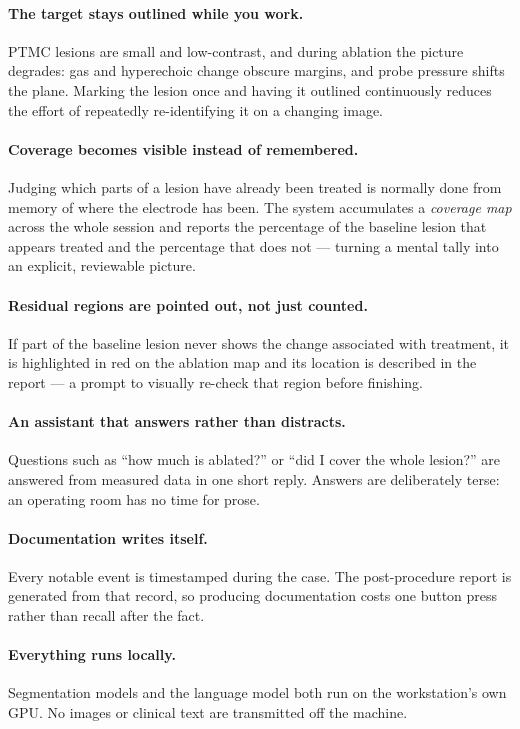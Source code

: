 \documentclass[11pt,a4paper]{article}
\begin{document}
\paragraph{The target stays outlined while you work.}
PTMC lesions are small and low-contrast, and during ablation the picture
degrades: gas and hyperechoic change obscure margins, and probe pressure
shifts the plane. Marking the lesion once and having it outlined continuously
reduces the effort of repeatedly re-identifying it on a changing image.

\paragraph{Coverage becomes visible instead of remembered.}
Judging which parts of a lesion have already been treated is normally done
from memory of where the electrode has been. The system accumulates a
\emph{coverage map} across the whole session and reports the percentage of the
baseline lesion that appears treated and the percentage that does not ---
turning a mental tally into an explicit, reviewable picture.

\paragraph{Residual regions are pointed out, not just counted.}
If part of the baseline lesion never shows the change associated with
treatment, it is highlighted in red on the ablation map and its location is
described in the report --- a prompt to visually re-check that region before
finishing.

\paragraph{An assistant that answers rather than distracts.}
Questions such as ``how much is ablated?'' or ``did I cover the whole
lesion?'' are answered from measured data in one short reply. Answers are
deliberately terse: an operating room has no time for prose.

\paragraph{Documentation writes itself.}
Every notable event is timestamped during the case. The post-procedure report
is generated from that record, so producing documentation costs one button
press rather than recall after the fact.

\paragraph{Everything runs locally.}
Segmentation models and the language model both run on the workstation's own
GPU. No images or clinical text are transmitted off the machine.
\end{document}
